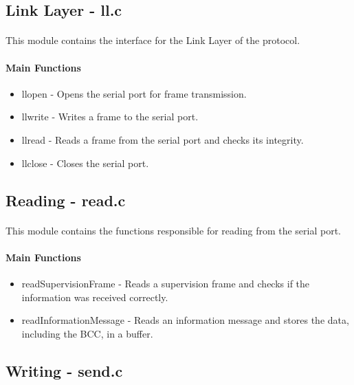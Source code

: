 \documentclass[11pt]{article}
\begin{document}
\subsection{Link Layer - ll.c}

\paragraph{}This module contains the interface for the Link Layer of the protocol.

\paragraph{Main Functions}

\begin{itemize}
        \item{llopen - Opens the serial port for frame transmission.}
        \item{llwrite - Writes a frame to the serial port.}
        \item{llread - Reads a frame from the serial port and checks its integrity.}
        \item{llclose - Closes the serial port.}
\end{itemize}

\subsection{Reading - read.c}

\paragraph{}This module contains the functions responsible for reading from the serial port.

\paragraph{Main Functions}

\begin{itemize}
  \item{readSupervisionFrame - Reads a supervision frame and checks if the information was received correctly.}
  \item{readInformationMessage - Reads an information message and stores the data, including the BCC, in a buffer.}
\end{itemize}

\subsection{Writing - send.c}
\end{document}
